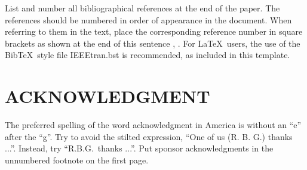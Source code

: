 \documentclass[a4paper,10pt,oneside]{article}
\begin{document}
\begin{sloppy}
List and number all bibliographical references at the end of the paper. The references should be numbered in order of appearance in the document. When referring to them in the text, place the corresponding reference number in square brackets as shown at the end of this sentence \cite{aBee2001}, \cite{mSmith2001}. For \LaTeX\ users, the use of the Bib\TeX\ style file IEEEtran.bst is recommended, as included in this template.

\section{ACKNOWLEDGMENT}
\label{sec:ack}

The preferred spelling of the word acknowledgment in America is without an ``e'' after the ``g''. Try to avoid the stilted expression, ``One of us (R. B. G.) thanks ...''. Instead, try ``R.B.G.\ thanks ...''. Put sponsor acknowledgments in the unnumbered footnote on the first page.



%
% 
%
% 

\end{sloppy}
\end{document}
